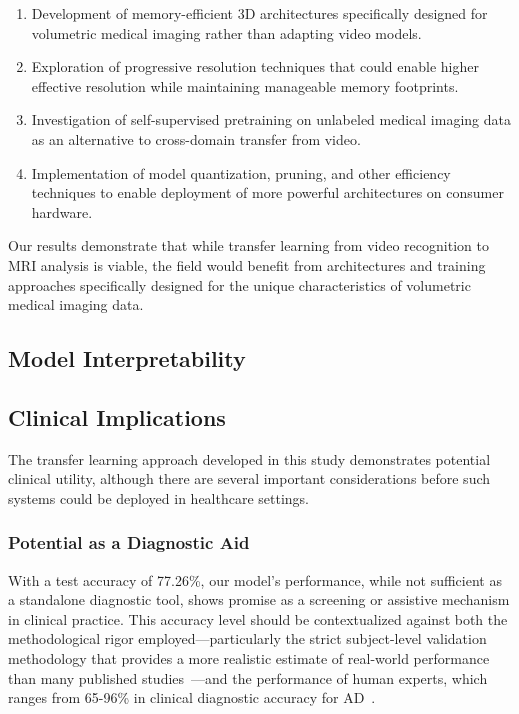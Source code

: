 \documentclass[12pt, a4paper]{article}
\begin{document}
\begin{enumerate}
    \item Development of memory-efficient 3D architectures specifically designed for volumetric medical imaging rather than adapting video models.
    
    \item Exploration of progressive resolution techniques that could enable higher effective resolution while maintaining manageable memory footprints.
    
    \item Investigation of self-supervised pretraining on unlabeled medical imaging data as an alternative to cross-domain transfer from video.
    
    \item Implementation of model quantization, pruning, and other efficiency techniques to enable deployment of more powerful architectures on consumer hardware.
\end{enumerate}

Our results demonstrate that while transfer learning from video recognition to MRI analysis is viable, the field would benefit from architectures and training approaches specifically designed for the unique characteristics of volumetric medical imaging data.

\subsection{Model Interpretability}

\subsection{Clinical Implications}

The transfer learning approach developed in this study demonstrates potential clinical utility, although there are several important considerations before such systems could be deployed in healthcare settings.

\subsubsection{Potential as a Diagnostic Aid}

With a test accuracy of 77.26\%, our model's performance, while not sufficient as a standalone diagnostic tool, shows promise as a screening or assistive mechanism in clinical practice. This accuracy level should be contextualized against both the methodological rigor employed—particularly the strict subject-level validation methodology that provides a more realistic estimate of real-world performance than many published studies~\cite{davatzikos2019machine}—and the performance of human experts, which ranges from 65-96\% in clinical diagnostic accuracy for AD~\cite{kloppel2008accuracy}.
\end{document}
